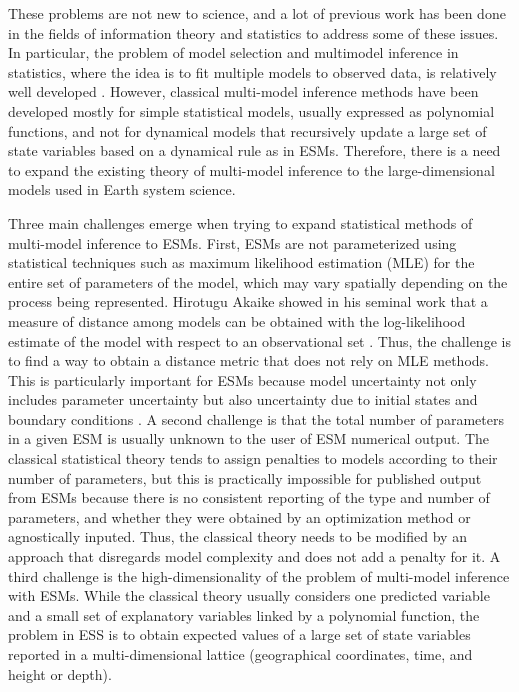 \documentclass[gmd, manuscript]{copernicus}
\begin{document}
These problems are not new to science, and a lot of previous work has been done in the fields of information theory and statistics to address some of these issues. In particular, the problem of model selection and multimodel inference in statistics, where the idea is to fit multiple models to observed data, is relatively well developed \citep{Anderson2007, Burnham2002, Millington2011, Claeskens2008}. However, classical multi-model inference methods have been developed mostly for simple statistical models, usually expressed as polynomial functions, and not for dynamical models that recursively update a large set of state variables based on a dynamical rule as in ESMs. Therefore, there is a need to expand the existing theory of multi-model inference to the large-dimensional models used in Earth system science.

Three main challenges emerge when trying to expand statistical methods of multi-model inference to ESMs. First, ESMs are not parameterized using statistical techniques such as maximum likelihood estimation (MLE) for the entire set of parameters of the model, which may vary spatially depending on the process being represented. Hirotugu Akaike showed in his seminal work that a measure of distance among models can be obtained with the log-likelihood estimate of the model with respect to an observational set \citep{Akaike1974, Akaike1981}. Thus, the challenge is to find a way to obtain a distance metric that does not rely on MLE methods. This is particularly important for ESMs because model uncertainty not only includes parameter uncertainty but also uncertainty due to initial states and boundary conditions \citep{Tebaldi2007}.
A second challenge is that the total number of parameters in a given ESM is usually unknown to the user of ESM numerical output. The classical statistical theory tends to assign penalties to models according to their number of parameters, but this is practically impossible for published output from ESMs because there is no consistent reporting of the type and number of parameters, and whether they were obtained by an optimization method or agnostically inputed. Thus, the classical theory needs to be modified by an approach that disregards model complexity and does not add a penalty for it. 
A third challenge is the high-dimensionality of the problem of multi-model inference with ESMs. While the classical theory usually considers one predicted variable and a small set of explanatory variables linked by a polynomial function, the problem in ESS is to obtain expected values of a large set of state variables reported in a multi-dimensional lattice (geographical coordinates, time, and height or depth). 
\end{document}
